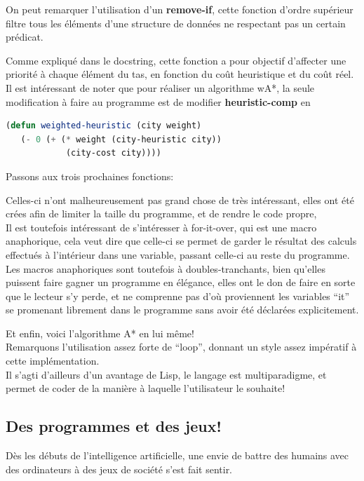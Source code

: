 \documentclass[a4paper, 12pt]{article}
\newcommand{\pather}[1]{
  
}
\numberwithin{equation}{subsection}
\begin{document}
On peut remarquer l'utilisation d'un {\bf remove-if}, cette fonction d'ordre supérieur filtre tous les éléments d'une structure de données ne respectant pas un certain prédicat.
\pather{64-69}
Comme expliqué dans le docstring, cette fonction a pour objectif d'affecter une priorité à chaque élément du tas, en fonction du coût heuristique et du coût réel. \\

Il est intéressant de noter que pour réaliser un algorithme wA*, la seule modification à faire au programme est de modifier {\bf heuristic-comp} en
\begin{lstlisting}[language=Lisp]
(defun weighted-heuristic (city weight)
   (- 0 (+ (* weight (city-heuristic city))
            (city-cost city))))
\end{lstlisting}
Passons aux trois prochaines fonctions:
\pather{71-85}
Celles-ci n'ont malheureusement pas grand chose de très intéressant,
elles ont été crées afin de limiter la taille du programme, et de rendre le code propre, \\

Il est toutefois intéressant de s'intéresser à for-it-over, qui est une macro anaphorique, cela veut dire que celle-ci se permet de garder le résultat des calculs effectués à l'intérieur dans une variable, passant celle-ci au reste du programme. \\

Les macros anaphoriques sont toutefois à doubles-tranchants, bien qu'elles puissent faire gagner un programme en élégance, elles ont le don de faire en sorte que le lecteur s'y perde, et ne comprenne pas d'où proviennent les variables ``it'' se promenant librement dans le programme sans avoir été déclarées explicitement.
\pather{89-130}
Et enfin, voici l'algorithme A* en lui même! \\

Remarquons l'utilisation assez forte de ``loop'', donnant un style assez impératif à cette implémentation. \\

Il s'agti d'ailleurs d'un avantage de Lisp, le langage est multiparadigme, et permet de coder de la manière à laquelle l'utilisateur le souhaite! \\
\subsection{Des programmes et des jeux!}
Dès les débuts de l'intelligence artificielle, une envie de battre des humains avec des ordinateurs à des jeux de société s'est fait sentir. \\
\end{document}
